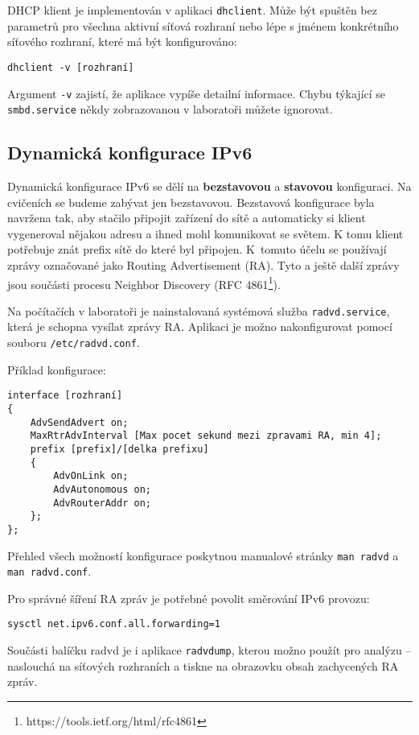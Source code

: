DHCP klient je implementován v aplikaci \texttt{dhclient}. Může být spuštěn bez
parametrů pro všechna aktivní síťová rozhraní nebo lépe s jménem konkrétního
síťového rozhraní, které má být konfigurováno:
\begin{verbatim}
dhclient -v [rozhraní]
\end{verbatim}
Argument \texttt{-v} zajistí, že aplikace vypíše detailní informace.
Chybu týkající se {\tt smbd.service} někdy zobrazovanou v laboratoři můžete ignorovat.

\subsection{Dynamická konfigurace IPv6}\label{dyn-ipv6}
Dynamická konfigurace IPv6 se dělí na {\bf bezstavovou} a {\bf stavovou}
konfiguraci. Na cvičeních se budeme zabývat jen bezstavovou. Bezstavová
konfigurace byla navržena tak, aby stačilo připojit zařízení do sítě a
automaticky si klient vygeneroval nějakou adresu a ihned mohl komunikovat se
světem. K tomu klient potřebuje znát prefix sítě do které byl připojen.
K~tomuto účelu se používají zprávy označované jako Routing Advertisement (RA).
Tyto a ještě další zprávy jsou součásti procesu Neighbor Discovery (RFC
4861\footnote{https://tools.ietf.org/html/rfc4861}).

Na počítačích v laboratoři je nainstalovaná systémová služba {\tt radvd.service},
která je schopna vysílat zprávy RA. Aplikaci je možno nakonfigurovat pomocí
souboru {\tt /etc/radvd.conf}.

Příklad konfigurace:
\begin{verbatim}
interface [rozhraní]
{
    AdvSendAdvert on;
    MaxRtrAdvInterval [Max pocet sekund mezi zpravami RA, min 4];
    prefix [prefix]/[delka prefixu]
    {
        AdvOnLink on;
        AdvAutonomous on;
        AdvRouterAddr on;
    };
};
\end{verbatim}
Přehled všech možností konfigurace poskytnou manualové stránky {\tt man radvd}
a {\tt man radvd.conf}.

Pro správné šíření RA zpráv je potřebné povolit směrování IPv6 provozu:
\begin{verbatim}
sysctl net.ipv6.conf.all.forwarding=1
\end{verbatim}

Součásti balíčku radvd je i aplikace {\tt radvdump}, kterou možno použít pro
analýzu -- naslouchá na síťových rozhraních a tiskne na obrazovku obsah
zachycených RA zpráv.
